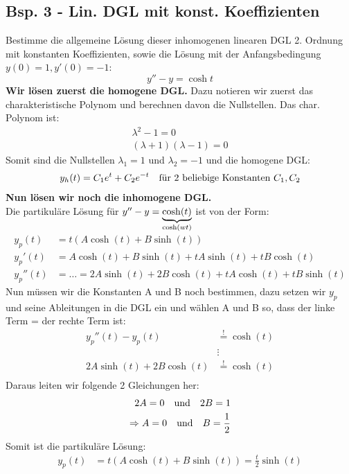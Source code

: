 \subsection{Bsp. 3 - Lin. DGL mit konst. Koeffizienten}
Bestimme die allgemeine Lösung dieser inhomogenen linearen DGL 2. Ordnung mit konstanten Koeffizienten, sowie die Lösung mit der Anfangsbedingung $y(0) = 1, y'(0) = -1$:
\[
	y'' - y = \cosh t
\]
\textbf{Wir lösen zuerst die homogene DGL.} Dazu notieren wir zuerst das charakteristische Polynom und berechnen davon die Nullstellen. Das char. Polynom ist:
\begin{align*}
	\lambda^2 - 1 = 0 \\
	(\lambda + 1) (\lambda - 1) = 0
\end{align*}
Somit sind die Nullstellen $\lambda_1 = 1$ und $\lambda_2 = -1$ und die homogene DGL:
\begin{align*}
	y_h(t) = C_1 e^t + C_2 e^{-t} \hspace{10pt} \text{für 2 beliebige Konstanten $C_1, C_2$}
\end{align*}
\textbf{Nun lösen wir noch die inhomogene DGL.} \\
Die partikuläre Lösung für $y'' - y = \underset{\cosh(wt)}{\underbrace{\cosh(t)}}$ ist von der Form:
\begin{align*}
	y_p(t) &= t (A \cosh(t) + B\sinh(t)) \\
	y_p'(t) &= A \cosh(t) + B\sinh(t) + tA\sinh(t) + tB\cosh(t) \\
	y_p''(t) &= \ldots = 2A\sinh(t) + 2B\cosh(t) + tA\cosh(t) + tB\sinh(t) 
\end{align*}
Nun müssen wir die Konstanten A und B noch bestimmen, dazu setzen wir $y_p$ und seine Ableitungen in die DGL ein und wählen A und B so, dass der linke Term = der rechte Term ist:
\begin{align*}
	y_p''(t) - y_p(t) &\overset{!}{=} \cosh(t) \\
	&\vdots \\
	2A\sinh(t) + 2B\cosh(t) &\overset{!}{=} \cosh(t) \\
\end{align*}
Daraus leiten wir folgende 2 Gleichungen her:
\begin{align*}
	2A = 0 \hspace{10pt} \text{und} \hspace{10pt} 2B = 1 \\
	\Rightarrow A = 0 \hspace{10pt} \text{und} \hspace{10pt} B = \frac{1}{2}
\end{align*}
Somit ist die partikuläre Lösung:
\begin{align*}
	y_p(t) &= t (A \cosh(t) + B\sinh(t)) = \frac{t}{2} \sinh(t)
\end{align*}
